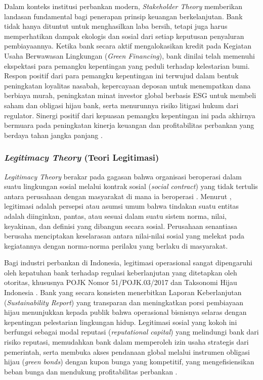 \documentclass[12pt,a4paper]{article}
\numberwithin{equation}{section}
\begin{document}
\noindent
Dalam konteks institusi perbankan modern, \emph{Stakeholder Theory} memberikan landasan fundamental bagi penerapan prinsip keuangan berkelanjutan. Bank tidak hanya dituntut untuk menghasilkan laba bersih, tetapi juga harus memperhatikan dampak ekologis dan sosial dari setiap keputusan penyaluran pembiayaannya. Ketika bank secara aktif mengalokasikan kredit pada Kegiatan Usaha Berwawasan Lingkungan (\emph{Green Financing}), bank dinilai telah memenuhi ekspektasi para pemangku kepentingan yang peduli terhadap kelestarian bumi. Respon positif dari para pemangku kepentingan ini terwujud dalam bentuk peningkatan loyalitas nasabah, kepercayaan deposan untuk menempatkan dana berbiaya murah, peningkatan minat investor global berbasis ESG untuk membeli saham dan obligasi hijau bank, serta menurunnya risiko litigasi hukum dari regulator. Sinergi positif dari kepuasan pemangku kepentingan ini pada akhirnya bermuara pada peningkatan kinerja keuangan dan profitabilitas perbankan yang berdaya tahan jangka panjang \citep{Buallay2019, Pramono2022}.

\subsubsection{\emph{Legitimacy Theory} (Teori Legitimasi)}
\noindent
\emph{Legitimacy Theory} berakar pada gagasan bahwa organisasi beroperasi dalam suatu lingkungan sosial melalui kontrak sosial (\emph{social contract}) yang tidak tertulis antara perusahaan dengan masyarakat di mana ia beroperasi \citep{Suchman1995, Deegan2002}. Menurut \citet{Suchman1995}, legitimasi adalah persepsi atau asumsi umum bahwa tindakan suatu entitas adalah diinginkan, pantas, atau sesuai dalam suatu sistem norma, nilai, keyakinan, dan definisi yang dibangun secara sosial. Perusahaan senantiasa berusaha menciptakan keselarasan antara nilai-nilai sosial yang melekat pada kegiatannya dengan norma-norma perilaku yang berlaku di masyarakat.

\noindent
Bagi industri perbankan di Indonesia, legitimasi operasional sangat dipengaruhi oleh kepatuhan bank terhadap regulasi keberlanjutan yang ditetapkan oleh otoritas, khususnya POJK Nomor 51/POJK.03/2017 dan Taksonomi Hijau Indonesia \citep{OJK2017, OJK2022}. Bank yang secara konsisten menerbitkan Laporan Keberlanjutan (\emph{Sustainability Report}) yang transparan dan meningkatkan porsi pembiayaan hijau menunjukkan kepada publik bahwa operasional bisnisnya selaras dengan kepentingan pelestarian lingkungan hidup. Legitimasi sosial yang kokoh ini berfungsi sebagai modal reputasi (\emph{reputational capital}) yang melindungi bank dari risiko reputasi, memudahkan bank dalam memperoleh izin usaha strategis dari pemerintah, serta membuka akses pendanaan global melalui instrumen obligasi hijau (\emph{green bonds}) dengan kupon bunga yang kompetitif, yang mengefisiensikan beban bunga dan mendukung profitabilitas perbankan \citep{Zhou2021, FitrianiWardani2024}.
\end{document}

